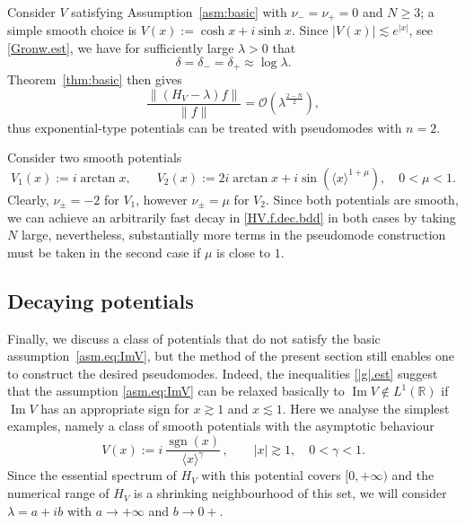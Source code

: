 \begin{Example}
	\label{ex:sinh}
Consider $V$ satisfying Assumption~\ref{asm:basic} 
with $\nu_-=\nu_+=0$ and $N\geq 3$; a simple smooth choice is 
$V(x) := \cosh x + i \sinh x$. 
Since $|V(x)| {\lesssim} e^{|x|}$, see \eqref{Gronw.est}, we have for sufficiently large $\lambda>0$ that 
\begin{equation}
\delta =\delta_- = \delta_+ \approx \log \lambda.
\end{equation}
Theorem~\ref{thm:basic} then gives
\begin{equation}
\frac{\|(H_V -\lambda) f\|}{\|f\|} = 
{\mathcal{O}} \left(\lambda^{\frac{2-N}2} \right), 
\end{equation}
thus exponential-type potentials can be treated with pseudomodes with $n=2$.
\end{Example}

\begin{Example}
	\label{ex:arctan}
Consider two smooth potentials
\begin{equation}
V_1(x) := i \arctan x, \qquad 
V_2(x) :=  2 i \arctan x +  i \sin \left(\langle x\rangle^{1+\mu} \right), 
\quad  0 < \mu <1.
\end{equation}
Clearly, $\nu_\pm=-2$ for $V_1$, however $\nu_\pm = \mu$ for $V_2$. Since both potentials are smooth, we can achieve an arbitrarily fast decay in \eqref{HV.f.dec.bdd} in both cases by taking $N$ large, nevertheless, substantially more terms in the pseudomode construction must be taken in the second case if $\mu$ is close to $1$.
\end{Example}

\subsection{Decaying potentials}
\label{subsec:dec}
Finally, we discuss a class of potentials that do not satisfy 
the basic assumption~\eqref{asm.eq:ImV},
but the method of the present section still enables one 
to construct the desired pseudomodes. Indeed,
the inequalities \eqref{|g|.est} suggest that the assumption \eqref{asm.eq:ImV} can be relaxed basically to ${\operatorname{Im}} V \notin L^1({\mathbb{R}})$ if ${\operatorname{Im}} V$ 
has an appropriate sign for $x {\gtrsim} 1$ and $x {\lesssim} 1$. Here we analyse the simplest examples, 
namely a class of smooth potentials with the asymptotic behaviour 
\begin{equation}
V(x) := i \, \frac{{\mathop{\mathrm{sgn}}\nolimits} (x)}{\langle x \rangle^\gamma} \,, 
\qquad |x| {\gtrsim} 1	, \quad 0 < \gamma <1.
\end{equation}
Since the essential spectrum of $H_V$ with this potential covers $[0, + \infty)$ and the numerical range of $H_V$ is a shrinking neighbourhood of this set, we will consider $\lambda = a + i b$ with $a \to +\infty$  and $b \to 0+$. 

